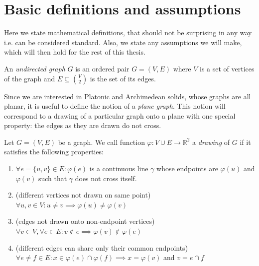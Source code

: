 
\section{Basic definitions and assumptions}

Here we state mathematical definitions, that should not be surprising in any way i.e. can be considered standard. Also, we state any assumptions we will make, which will then hold for the rest of this thesis.

\begin{definition}
    An \textit{undirected graph} $G$ is an ordered pair $G=(V,E)$ where $V$ is a set of vertices of the graph and $E \subseteq \binom{V}{2}$ is the set of its edges. 
\end{definition}

Since we are interested in Platonic and Archimedean solids, whose graphs are all planar, it is useful to define the notion of a \textit{plane graph}. This notion will correspond to a drawing of a particular graph onto a plane with one special property: the edges as they are drawn do not cross.

\begin{definition}
    Let $G=(V,E)$ be a graph. We call function $\varphi : V \cup E \rightarrow \mathbb{R}^2$ a \textit{drawing} of $G$ if it satisfies the following properties:
    \begin{enumerate}
    
        \item $\forall e=\{u,v\} \in E : \varphi(e)$ is a continuous line $\gamma$ whose endpoints are $\varphi(u)$ and $\varphi(v)$ such that $\gamma$ does not cross itself.
        
        \item (different vertices not drawn on same point) \\ $\forall u,v \in V : u \neq v \implies \varphi(u) \neq \varphi(v)$
        
        \item (edges not drawn onto non-endpoint vertices) \\ $\forall v \in V, \forall e \in E: v \notin e \implies \varphi(v) \notin \varphi(e)$
        
        \item (different edges can share only their common endpoints) \\ $\forall e \neq f \in E : x \in \varphi(e) \cap \varphi(f) \implies x = \varphi(v)$ and $v = e \cap f$
    \end{enumerate}
\end{definition}

